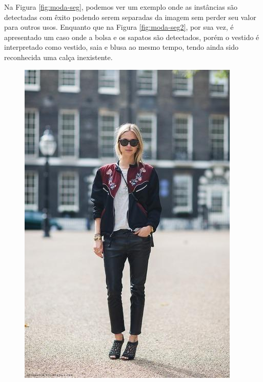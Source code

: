 \documentclass[12pt]{report}
\begin{document}
Na Figura \ref{fig:moda-seg}, podemos ver um exemplo onde as instâncias são detectadas com êxito podendo serem separadas da imagem sem perder seu valor para outros usos. Enquanto que na Figura \ref{fig:moda-seg2}, por sua vez, é apresentado um caso onde a bolsa e os sapatos são detectados, porém o vestido é interpretado como vestido, saia e blusa ao mesmo tempo, tendo ainda sido reconhecida uma calça inexistente. 

\begin{figure}
  \centering
  \begin{minipage}[b]{0.3\textwidth}
    \includegraphics[width=\textwidth]{images/resultados/1060077original.jpg}
  \end{minipage}
  \hfill
  \begin{minipage}[b]{0.3\textwidth}

\end{minipage}
\end{figure}
\end{document}
